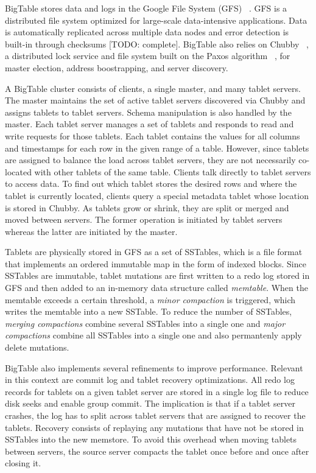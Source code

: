 \documentclass[10pt,final,journal]{IEEEtran}
\begin{document}
BigTable stores data and logs in the Google File System (GFS) ~\cite{Ghemawat:2003:GFS:1165389.945450}. GFS is a distributed file system optimized for large-scale data-intensive applications. Data is automatically replicated across multiple data nodes and error detection is built-in through checksums [TODO: complete]. BigTable also relies on Chubby ~\cite{Burrows:2006}, a distributed lock service and file system built on the Paxos algorithm ~\cite{Lamport:1998:PP:279227.279229, Lamport:2001:PMS}, for master election, address boostrapping, and server discovery.

A BigTable cluster consists of clients, a single master, and many tablet servers. The master maintains the set of active tablet servers discovered via Chubby and assigns tablets to tablet servers. Schema manipulation is also handled by the master. Each tablet server manages a set of tablets and responds to read and write requests for those tablets. Each tablet contains the values for all columns and timestamps for each row in the given range of a table. However, since tablets are assigned to balance the load across tablet servers, they are not necessarily co-located with other tablets of the same table. Clients talk directly to tablet servers to access data. To find out which tablet stores the desired rows and where the tablet is currently located, clients query a special metadata tablet whose location is stored in Chubby. As tablets grow or shrink, they are split or merged and moved between servers. The former operation is initiated by tablet servers whereas the latter are initiated by the master.

Tablets are physically stored in GFS as a set of SSTables, which is a file format that implements an ordered immutable map in the form of indexed blocks. Since SSTables are immutable, tablet mutations are first written to a redo log stored in GFS and then added to an in-memory data structure called \emph{memtable}. When the memtable exceeds a certain threshold, a \emph{minor compaction} is triggered, which writes the memtable into a new SSTable. To reduce the number of SSTables, \emph{merging compactions} combine several SSTables into a single one and \emph{major compactions} combine all SSTables into a single one and also permantenly apply delete mutations.

BigTable also implements several refinements to improve performance. Relevant in this context are commit log and tablet recovery optimizations. All redo log records for tablets on a given tablet server are stored in a single log file to reduce disk seeks and enable group commit. The implication is that if a tablet server crashes, the log has to split across tablet servers that are assigned to recover the tablets. Recovery consists of replaying any mutations that have not be stored in SSTables into the new memstore. To avoid this overhead when moving tablets between servers, the source server compacts the tablet once before and once after closing it.
\end{document}
